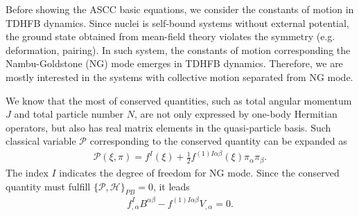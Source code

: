 \documentclass[%
superscriptaddress,
showpacs,
nofootinbib,
amsmath,amssymb,
aps,
prc,
twocolumn,
floatfix ]%
{revtex4-1}
\begin{document}
Before showing the ASCC basic equations, we consider the constants of motion in TDHFB dynamics. Since nuclei is self-bound systems without external potential, the ground state obtained from mean-field theory violates the symmetry (e.g. deformation, pairing). In such system, the constants of motion corresponding the Nambu-Goldstone (NG) mode emerges in TDHFB dynamics. Therefore, we are mostly interested in the systems with collective motion separated from NG mode.\par
We know that the most of conserved quantities, such as total angular momentum $J$ and total particle number $N$, are not only expressed by one-body Hermitian operators, but also has real matrix elements in the quasi-particle basis. Such classical variable $\mathcal{P}$ corresponding to the conserved quantity can be expanded as
\begin{align}
  \mathcal{P}(\xi,\pi) = f^I(\xi) + \frac{1}{2}f^{(1)I\alpha\beta}(\xi)\pi_{\alpha}\pi_{\beta} . \label{P}
\end{align}
The index $I$ indicates the degree of freedom for NG mode. Since the conserved quantity must fulfill $\{\mathcal{P},\mathcal{H}\}_{PB}=0$, it leads
\begin{align}
  f^{I}_{,\alpha}B^{\alpha\beta} - f^{(1)I\alpha\beta}V_{,\alpha} = 0.
  \label{P_PB}
\end{align}
\end{document}

